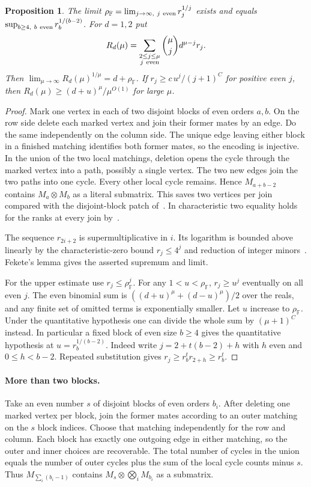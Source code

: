 \documentclass[11pt]{article}
\newtheorem{proposition}[theorem]{Proposition}
\theoremstyle{definition}
\newcommand{\F}{\mathbb F}
\begin{document}
\begin{proposition}\label{prop:rank-rate}
The limit \(\rho_\F=\lim_{j\to\infty,\ j\ {\rm even}}r_j^{1/j}\) exists and equals \(\sup_{b\ge4,\ b\ {\rm even}} r_b^{1/(b-2)}\). For \(d=1,2\) put
\[
 R_d(\mu)=\sum_{\substack{2\le j\le \mu\\j\ {\rm even}}}
                 \binom \mu j d^{\mu-j}r_j .
\]
Then \(\lim_{\mu\to\infty}R_d(\mu)^{1/\mu}=d+\rho_\F\). If \(r_j\ge c\,u^j/(j+1)^C\) for positive even \(j\), then \(R_d(\mu)\ge(d+u)^\mu/\mu^{O(1)}\) for large \(\mu\).
\end{proposition}
\begin{proof}
Mark one vertex in each of two disjoint blocks of even orders \(a,b\). On the row side delete each marked vertex and join their former mates by an edge. Do the same independently on the column side. The unique edge leaving either block in a finished matching identifies both former mates, so the encoding is injective. In the union of the two local matchings, deletion opens the cycle through the marked vertex into a path, possibly a single vertex. The two new edges join the two paths into one cycle. Every other local cycle remains. Hence \(M_{a+b-2}\) contains \(M_a\otimes M_b\) as a literal submatrix. This saves two vertices per join compared with the disjoint-block patch of~\cite[Lemma~3.5]{cln}. In characteristic two equality holds for the ranks at every join by~\cite{ckn}.

The sequence \(r_{2i+2}\) is supermultiplicative in \(i\). Its logarithm is bounded above linearly by the characteristic-zero bound \(r_j\le4^j\) and reduction of integer minors~\cite{cln}. Fekete's lemma gives the asserted supremum and limit.

For the upper estimate use \(r_j\le\rho_\F^j\). For any \(1<u<\rho_\F\), \(r_j\ge u^j\) eventually on all even \(j\). The even binomial sum is \(((d+u)^\mu+(d-u)^\mu)/2\) over the reals, and any finite set of omitted terms is exponentially smaller. Let \(u\) increase to \(\rho_\F\). Under the quantitative hypothesis one can divide the whole sum by \((\mu+1)^C\) instead. In particular a fixed block of even size \(b\ge4\) gives the quantitative hypothesis at \(u=r_b^{1/(b-2)}\). Indeed write \(j=2+t(b-2)+h\) with \(h\) even and \(0\le h<b-2\). Repeated substitution gives \(r_j\ge r_b^t r_{2+h}\ge r_b^t\).
\end{proof}

\paragraph{More than two blocks.}
Take an even number \(s\) of disjoint blocks of even orders \(b_i\). After deleting one marked vertex per block, join the former mates according to an outer matching on the \(s\) block indices. Choose that matching independently for the row and column. Each block has exactly one outgoing edge in either matching, so the outer and inner choices are recoverable. The total number of cycles in the union equals the number of outer cycles plus the sum of the local cycle counts minus \(s\). Thus \(M_{\sum_i(b_i-1)}\) contains \(M_s\otimes\bigotimes_i M_{b_i}\) as a submatrix.
\end{document}
